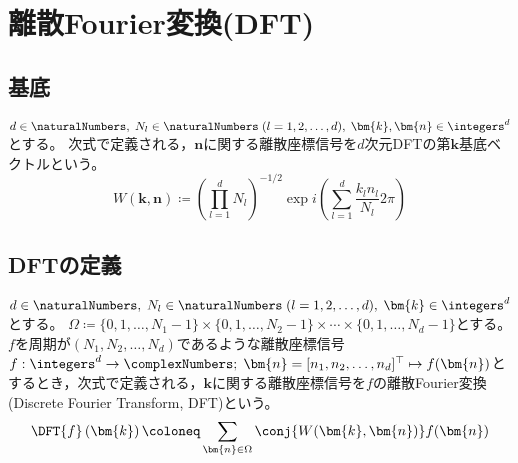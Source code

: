\chapter{離散Fourier変換(DFT)}
    \newcommand{\DFTwithArg}[2]{\DFT{#1}\left(#2\right)}
    \section{基底}
        $d\in\naturalNumbers,\;N_l\in\naturalNumbers\;(l=1,2,\dots,d),\;\bm{k},\bm{n}\in\integers^d$とする。
        次式で定義される，$\bm{n}$に関する離散座標信号を$d$次元DFTの第$\bm{k}$基底ベクトルという。
        \[ W(\bm{k},\bm{n}) \coloneq \left(\prod_{l=1}^d N_l\right)^{-1/2} \exp i\left(\sum_{l=1}^d \frac{k_l n_l}{N_l}2\pi\right)\]

    \section{DFTの定義}
        \label{DFTの定義}
        $d\in\naturalNumbers,\;N_l\in\naturalNumbers\;(l=1,2,\dots,d),\;\bm{k}\in\integers^d$とする。
        $\Omega \coloneq \{0,1,\dots,N_1-1\}\times\{0,1,\dots,N_2-1\}\times\cdots\times\{0,1,\dots,N_d-1\}$とする。
        $f$を周期が$(N_1,N_2,\dots,N_d)$であるような離散座標信号$f: \integers^d\to\complexNumbers;\;\bm{n} = [n_1,n_2,\dots,n_d]^\top \mapsto f(\bm{n})$とするとき，次式で定義される，$\bm{k}$に関する離散座標信号を$f$の離散Fourier変換(Discrete Fourier Transform, DFT)という。
        \[ \DFTwithArg{f}{\bm{k}} \coloneq \sum_{\bm{n}\in\Omega} \conj{W(\bm{k},\bm{n})} f(\bm{n}) \]

